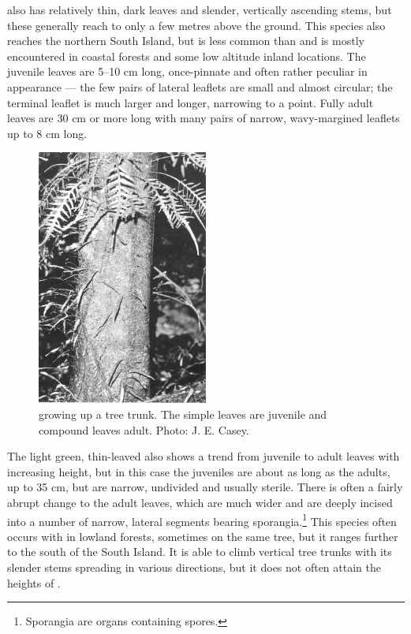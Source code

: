  also has relatively thin, dark leaves and slender, vertically ascending stems, but these generally reach to only a few metres above the ground.
This species also reaches the northern South Island, but is less common than  and is mostly encountered in coastal forests and some low altitude inland locations.
The juvenile leaves are 5--10 cm long, once-pinnate and often rather peculiar in appearance --- the few pairs of lateral leaflets are small and almost circular; the terminal leaflet is much larger and longer, narrowing to a point.
Fully adult leaves are 30 cm or more long with many pairs of narrow, wavy-margined leaflets up to 8 cm long.

\begin{figure}
	\includegraphics[width=0.5\textwidth]{graphics/figure29scandens.jpg}
	\centering
	\caption[\emph{Phymatosorus scandens} growing up a tree trunk]{ growing up a tree trunk.
The simple leaves are juvenile and compound leaves adult.
	Photo: J. E. Casey.}%
	\label{fig:29scandens}
\end{figure}

The light green, thin-leaved  also shows a trend from juvenile to adult leaves with increasing height, but in this case the juveniles are about as long as the adults, up to 35 cm, but are narrow, undivided and usually sterile.
There is often a fairly abrupt change to the adult leaves, which are much wider and are deeply incised into a number of narrow, lateral segments bearing sporangia.\footnote{Sporangia are organs containing spores.}
This species often occurs with  in lowland forests, sometimes on the same tree, but it ranges further to the south of the South Island.
It is able to climb vertical tree trunks with its slender stems spreading in various directions, but it does not often attain the heights of .

